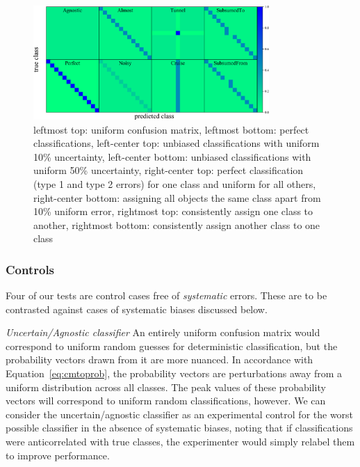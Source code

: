 \begin{figure}
	\begin{center}
    \includegraphics[width=0.8\textwidth]{./fig/all_sim_cm.png}
		\caption{leftmost top: uniform confusion matrix,
    leftmost bottom: perfect classifications,
    left-center top: unbiased classifications with uniform 10\% uncertainty,
    left-center bottom: unbiased classifications with uniform 50\% uncertainty,
    right-center top: perfect classification (type 1 and type 2 errors) for one class and uniform for all others,
    right-center bottom: assigning all objects the same class apart from 10\% uniform error,
    rightmost top: consistently assign one class to another,
    rightmost bottom: consistently assign another class to one class}
		\label{fig:mock_cm}
	\end{center}
\end{figure}

\subsubsection{Controls}
\label{sec:unbiased}

Four of our tests are control cases free of \textit{systematic} errors.
These are to be contrasted against cases of systematic biases discussed below.

\textit{Uncertain/Agnostic classifier}
An entirely uniform confusion matrix would correspond to uniform random guesses for deterministic classification, but the probability vectors drawn from it are more nuanced.
In accordance with Equation~\ref{eq:cmtoprob}, the probability vectors are perturbations away from a  uniform distribution across all classes.
The peak values of these probability vectors will correspond to uniform random classifications, however.
We can consider the uncertain/agnostic classifier as an experimental control for the worst possible classifier in the absence of systematic biases, noting that if classifications were anticorrelated with true classes, the experimenter would simply relabel them to improve performance.

